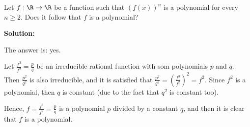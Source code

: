 \documentclass[../../main.tex]{subfiles}
\begin{document}
  \begin{shaded}
    Let $f: \R \to \R$ be a function such that $(f(x))^n$ is a polynomial for every $n \geq 2$. Does it follow that $f$ is a polynomial?
  \end{shaded}

  \textbf{Solution:}

  The answer is: yes.

  Let $\displaystyle\frac{f^3}{f^2} = \displaystyle\frac{p}{q}$ be an irreducible rational function with som polynomials $p$ and $q$. Then $\displaystyle\frac{p^2}{q^2}$ is also irreducible, and it is satisfied that $\displaystyle\frac{p^2}{q^2} = \left(\displaystyle\frac{f^3}{f^2}\right)^2 = f^2$. Since $f^2$ is a polynomial, then $q$ is constant (due to the fact that $q^2$ is constant too).

  Hence, $f = \displaystyle\frac{f^3}{f^2} = \displaystyle\frac{p}{q}$ is a polynomial $p$ divided by a constant $q$, and then it is clear that $f$ is a polynomial.
\end{document}
